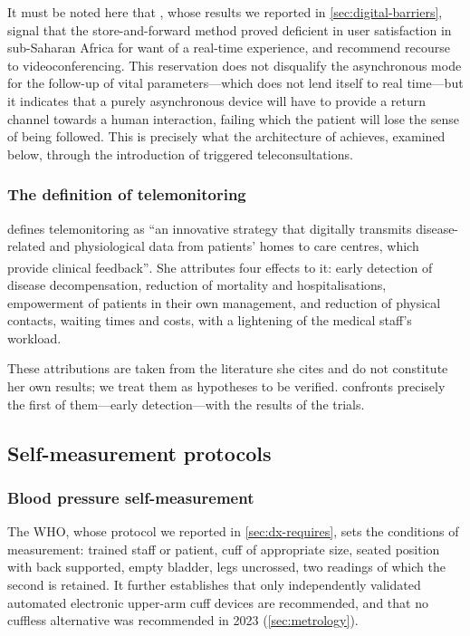 \documentclass[12pt,a4paper,oneside]{report}
\newcommand{\bq}[1]{``#1''\textsuperscript{\dag}}
\begin{document}
It must be noted here that \textcite{dodoo2022}, whose results we reported in \cref{sec:digital-barriers}, signal that the store-and-forward method proved deficient in user satisfaction in sub-Saharan Africa for want of a real-time experience, and recommend recourse to videoconferencing. This reservation does not disqualify the asynchronous mode for the follow-up of vital parameters---which does not lend itself to real time---but it indicates that a purely asynchronous device will have to provide a return channel towards a human interaction, failing which the patient will lose the sense of being followed. This is precisely what the architecture of \textcite{mihevc2025} achieves, examined below, through the introduction of triggered teleconsultations.

\subsubsection{The definition of telemonitoring}

\textcite{navarro2023} defines telemonitoring as \bq{an innovative strategy that digitally transmits disease-related and physiological data from patients' homes to care centres, which provide clinical feedback}. She attributes four effects to it: early detection of disease decompensation, reduction of mortality and hospitalisations, empowerment of patients in their own management, and reduction of physical contacts, waiting times and costs, with a lightening of the medical staff's workload.

These attributions are taken from the literature she cites and do not constitute her own results; we treat them as hypotheses to be verified.  confronts precisely the first of them---early detection---with the results of the trials.

\subsection{Self-measurement protocols}\label{sec:protocols}

\subsubsection{Blood pressure self-measurement}

The WHO, whose protocol we reported in \cref{sec:dx-requires}, sets the conditions of measurement: trained staff or patient, cuff of appropriate size, seated position with back supported, empty bladder, legs uncrossed, two readings of which the second is retained. It further establishes that only independently validated automated electronic upper-arm cuff devices are recommended, and that no cuffless alternative was recommended in 2023 (\cref{sec:metrology}).
\end{document}
